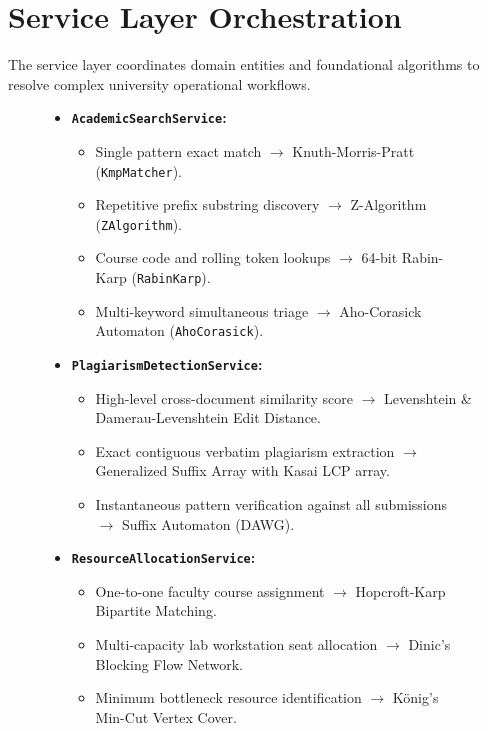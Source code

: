 \section{Service Layer Orchestration}
The service layer coordinates domain entities and foundational algorithms to resolve complex university operational workflows.

\begin{figure}[H]
\centering
\begin{tcolorbox}[colback=codebackground,colframe=primaryblue,title=\textbf{EduTrack Service Layer Workflow Mapping}]
\begin{itemize}
    \item \textbf{\texttt{AcademicSearchService}:}
    \begin{itemize}
        \item Single pattern exact match $\to$ Knuth-Morris-Pratt (\texttt{KmpMatcher}).
        \item Repetitive prefix substring discovery $\to$ Z-Algorithm (\texttt{ZAlgorithm}).
        \item Course code and rolling token lookups $\to$ 64-bit Rabin-Karp (\texttt{RabinKarp}).
        \item Multi-keyword simultaneous triage $\to$ Aho-Corasick Automaton (\texttt{AhoCorasick}).
    \end{itemize}
    \item \textbf{\texttt{PlagiarismDetectionService}:}
    \begin{itemize}
        \item High-level cross-document similarity score $\to$ Levenshtein \& Damerau-Levenshtein Edit Distance.
        \item Exact contiguous verbatim plagiarism extraction $\to$ Generalized Suffix Array with Kasai LCP array.
        \item Instantaneous pattern verification against all submissions $\to$ Suffix Automaton (DAWG).
    \end{itemize}
    \item \textbf{\texttt{ResourceAllocationService}:}
    \begin{itemize}
        \item One-to-one faculty course assignment $\to$ Hopcroft-Karp Bipartite Matching.
        \item Multi-capacity lab workstation seat allocation $\to$ Dinic's Blocking Flow Network.
        \item Minimum bottleneck resource identification $\to$ König's Min-Cut Vertex Cover.

\end{itemize}
\end{itemize}
\end{tcolorbox}
\end{figure}
